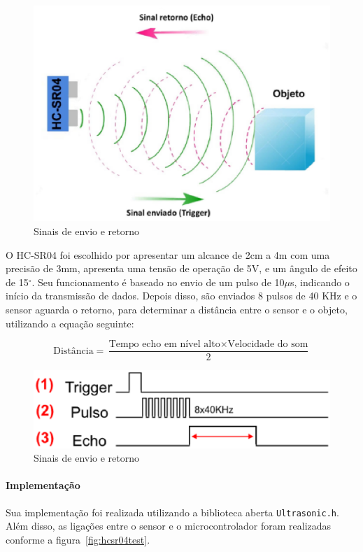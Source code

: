	\begin{figure}[!htbp]
		\begin{center}
			\includegraphics[width=.7\textwidth]{figuras/echo.eps}
			\caption{Sinais de envio e retorno}
		\end{center}
	\end{figure}

O HC-SR04 foi escolhido por apresentar um alcance de 2cm a 4m com uma precisão de 3mm, apresenta uma tensão de operação de 5V, e um ângulo de efeito de 15$^{\circ}$. Seu funcionamento é baseado no envio de um pulso de 10$\mu$s, indicando o início da transmissão de dados. Depois disso, são enviados 8 pulsos de 40 KHz e o sensor aguarda o retorno, para determinar a distância entre o sensor e o objeto, utilizando a equação seguinte:

$$
\textrm{Distância} = \frac{\textrm{Tempo echo em nível alto} \times \textrm{Velocidade do som}}{2}
$$

	\begin{figure}[!htbp]
		\begin{center}
			\includegraphics[width=.7\textwidth]{figuras/hcsr04_signals.eps}
			\caption{Sinais de envio e retorno}
		\end{center}
	\end{figure}

\paragraph{Implementação}
Sua implementação foi realizada utilizando a biblioteca aberta \texttt{Ultrasonic.h}.
Além disso, as ligações entre o sensor e o microcontrolador foram realizadas conforme a figura~\ref{fig:hcsr04test}.

